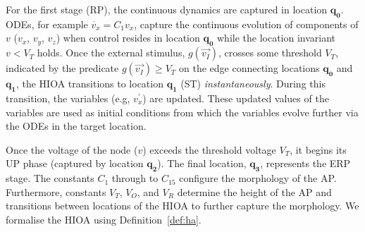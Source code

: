 For the first stage (\ac{RP}), the continuous dynamics are captured in
location $\mathbf{q_0}$. \acfp{ODE}, for example \mbox{$\dot{v_{x}} = 
C_{1}v_{x}$}, capture the continuous evolution of components of $v$ ($v_{x}$, 
$v_{y}$, $v_{z}$) when control resides in location $\mathbf{q_{0}}$ 
while the location invariant $v < V_{T}$ holds.  Once the external
stimulus, $g(\vec{v_{I}})$, crosses some threshold $V_{T}$, indicated by
the predicate \mbox{$g(\vec{v_{I}}) \geq V_{T}$} on the edge connecting
locations $\mathbf{q_{0}}$ and $\mathbf{q_{1}}$, the \ac{HIOA}
transitions to location $\mathbf{q_{1}}$ (\ac{ST})
\textit{instantaneously}. During this transition, the variables (e.g,
$v^{\prime}_{x}$) are updated. These updated values of the variables are
used as initial conditions from which the variables evolve further via
the \acp{ODE} in the target location.

Once the voltage of the node ($v$) exceeds the threshold voltage
$V_{T}$, it begins its \ac{UP} phase (captured by location
$\mathbf{q_2}$). The final location, $\mathbf{q_3}$, represents the
\ac{ERP} stage. The constants $C_1$ through to $C_{15}$ configure the
morphology of the \ac{AP}. Furthermore, constants $V_T$, $V_O$, and
$V_R$ determine the height of the \ac{AP} and transitions between
locations of the \ac{HIOA} to further capture the morphology.
We formalise the \ac{HIOA} using Definition~\ref{def:ha}.

